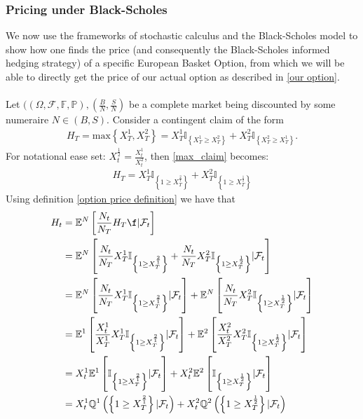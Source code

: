 \documentclass{article}
\theoremstyle{definition}
\begin{document}
\subsubsection{Pricing under Black-Scholes}
We now use the frameworks of stochastic calculus and the Black-Scholes model to show how one finds the price (and consequently the Black-Scholes informed hedging strategy) of a specific European Basket Option, from which we will be able to directly get the price of our actual option as described in \ref{our option}.\\\\
Let $((\Omega, \mathcal{F}, \mathbb{F}, \mathbb{P}), (\frac{B}{N},\frac{S}{N})$ be a complete market being discounted by some numeraire $N \in (B,S)$.
Consider a contingent claim of the form 
\begin{align}
\label{max_claim}
H_{T}= \text{max}\left\{X_{T}^{1}, X_{T}^{2}\right\} = X_{T}^{1} \mathbb{I}_{\left\{X_{T}^{1} \geq X_{T}^{2}\right\}} + X_{T}^{2} \mathbb{I}_{\left\{X_{T}^{2} \geq X_{T}^{1}\right\}}.
\end{align}
For notational ease set: $X_{t}^{\frac{1}{2}} =\frac{X_{t}^1}{X_{t}^{2}} $, then \ref{max_claim} becomes:
\begin{align}
H_{T} = X_{T}^{1} \mathbb{I}_{\left\{1 \geq X_{T}^{\frac{2}{1}}\right\}} + X_{T}^{2} \mathbb{I}_{\left\{1 \geq X_{T}^{\frac{1}{2}}\right\}}
\end{align}
Using definition \ref{option price definition} we have that 
\begin{align}
    \label{Ht}
    H_{t} &= \mathbb{E}^N\left[\frac{N_{t}}{N_T} H_{T} \f| \mathcal{F}_{t}\right]\\
    &= \mathbb{E}^N\left[\frac{N_{t}}{N_T} X_{T}^{1} \mathbb{I}_{\left\{1 \geq X_{T}^{\frac{2}{1}}\right\}} + \frac{N_{t}}{N_T} X_{T}^{2} \mathbb{I}_{\left\{1 \geq X_{T}^{\frac{1}{2}}\right\}}|\mathcal{F}_{t}\right ]\\
    \label{pre change numeraire}
    &=\mathbb{E}^N\left[\frac{N_{t}}{N_T} X_{T}^{1} \mathbb{I}_{\left\{1 \geq X_{T}^{\frac{2}{1}}\right\}}|\mathcal{F}_{t}\right] + \mathbb{E}^N\left[\frac{N_{t}}{N_T} X_{T}^{2} \mathbb{I}_{\left\{1 \geq X_{T}^{\frac{1}{2}}\right\}}|\mathcal{F}_{t}\right ]\\
    \label{post change numeraire}
    &=\mathbb{E}^{1}\left[\frac{X_{t}^{1}}{X_{T}^{1}}X_{T}^{1} \mathbb{I}_{\left\{1 \geq X_{T}^{\frac{2}{1}}\right\}}|\mathcal{F}_{t}\right] + \mathbb{E}^{2}\left[\frac{X_{t}^{2}}{X_{T}^{2}}X_{T}^{2} \mathbb{I}_{\left\{1 \geq X_{T}^{\frac{1}{2}}\right\}}|\mathcal{F}_{t}\right ]\\
    &=X_{t}^{1}\mathbb{E}^{1}\left[\mathbb{I}_{\left\{1 \geq X_{T}^{\frac{2}{1}}\right\}}|\mathcal{F}_{t}\right] + X_{t}^{2}\mathbb{E}^{2}\left[\mathbb{I}_{\left\{1 \geq X_{T}^{\frac{1}{2}}\right\}}|\mathcal{F}_{t}\right]\\
    \label{probabilities for holdings}
    &=X_{t}^{1} \mathbb{Q}^{1}\left(\left\{1 \geq X_{T}^{\frac{2}{1}}\right\}|\mathcal{F}_{t}\right) + X_{t}^{2} \mathbb{Q}^{2}\left(\left\{1 \geq X_{T}^{\frac{1}{2}}\right\}|\mathcal{F}_{t}\right)
\end{align}\\\\
\end{document}
